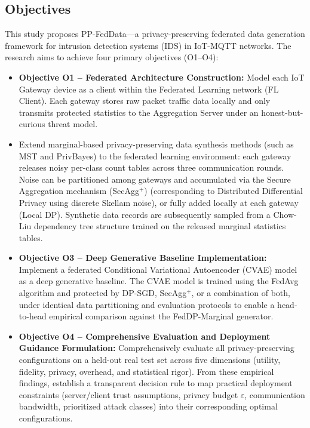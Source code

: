 \subsection{Objectives}
This study proposes PP-FedData---a privacy-preserving federated data generation framework for intrusion detection systems (IDS) in IoT-MQTT networks. The research aims to achieve four primary objectives (O1--O4):
\begin{itemize}
    \item \textbf{Objective O1 -- Federated Architecture Construction:} Model each IoT Gateway device as a client within the Federated Learning network (FL Client). Each gateway stores raw packet traffic data locally and only transmits protected statistics to the Aggregation Server under an honest-but-curious threat model.
    \item \textbf{} Extend marginal-based privacy-preserving data synthesis methods (such as MST and PrivBayes) to the federated learning environment: each gateway releases noisy per-class count tables across three communication rounds. Noise can be partitioned among gateways and accumulated via the Secure Aggregation mechanism (SecAgg$^+$) (corresponding to Distributed Differential Privacy using discrete Skellam noise), or fully added locally at each gateway (Local DP). Synthetic data records are subsequently sampled from a Chow-Liu dependency tree structure trained on the released marginal statistics tables.
    \item \textbf{Objective O3 -- Deep Generative Baseline Implementation:} Implement a federated Conditional Variational Autoencoder (CVAE) model as a deep generative baseline. The CVAE model is trained using the FedAvg algorithm and protected by DP-SGD, SecAgg$^+$, or a combination of both, under identical data partitioning and evaluation protocols to enable a head-to-head empirical comparison against the FedDP-Marginal generator.
    \item \textbf{Objective O4 -- Comprehensive Evaluation and Deployment Guidance Formulation:} Comprehensively evaluate all privacy-preserving configurations on a held-out real test set across five dimensions (utility, fidelity, privacy, overhead, and statistical rigor). From these empirical findings, establish a transparent decision rule to map practical deployment constraints (server/client trust assumptions, privacy budget $\varepsilon$, communication bandwidth, prioritized attack classes) into their corresponding optimal configurations.
\end{itemize}

